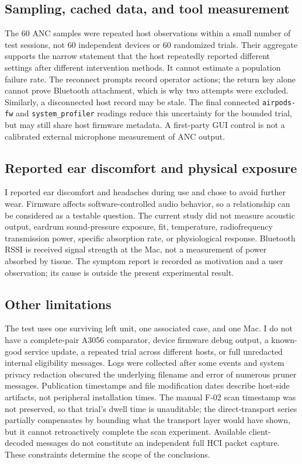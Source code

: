 \documentclass[11pt,letterpaper]{article}
\begin{document}
\subsection{Sampling, cached data, and tool measurement}
The 60 ANC samples were repeated host observations within a small number of test sessions, not 60 independent devices or 60 randomized trials. Their aggregate supports the narrow statement that the host repeatedly reported different settings after different intervention methods. It cannot estimate a population failure rate. The reconnect prompts record operator actions; the return key alone cannot prove Bluetooth attachment, which is why two attempts were excluded. Similarly, a disconnected host record may be stale. The final connected \texttt{airpods-fw} and \texttt{system\_profiler} readings reduce this uncertainty for the bounded trial, but may still share host firmware metadata. A first-party GUI control is not a calibrated external microphone measurement of ANC output.

\subsection{Reported ear discomfort and physical exposure}
I reported ear discomfort and headaches during use and chose to avoid further wear. Firmware affects software-controlled audio behavior, so a relationship can be considered as a testable question. The current study did not measure acoustic output, eardrum sound-pressure exposure, fit, temperature, radiofrequency transmission power, specific absorption rate, or physiological response. Bluetooth RSSI is received signal strength at the Mac, not a measurement of power absorbed by tissue. The symptom report is recorded as motivation and a user observation; its cause is outside the present experimental result.

\subsection{Other limitations}
The test uses one surviving left unit, one associated case, and one Mac. I do not have a complete-pair A3056 comparator, device firmware debug output, a known-good service update, a repeated trial across different hosts, or full unredacted internal eligibility messages. Logs were collected after some events and system privacy redaction obscured the underlying filename and error of numerous pruner messages. Publication timestamps and file modification dates describe host-side artifacts, not peripheral installation times. The manual F-02 scan timestamp was not preserved, so that trial's dwell time is unauditable; the direct-transport series partially compensates by bounding what the transport layer would have shown, but it cannot retroactively complete the scan experiment. Available client-decoded messages do not constitute an independent full HCI packet capture. These constraints determine the scope of the conclusions.
\end{document}
